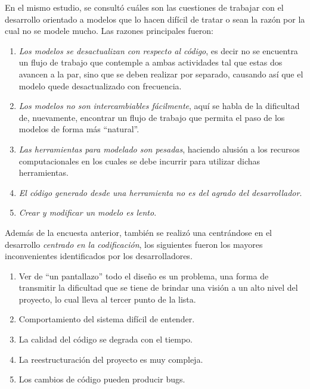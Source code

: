 En el mismo estudio, se consultó cuáles son las cuestiones de trabajar con el
desarrollo orientado a modelos que lo hacen difícil de tratar o sean la razón
por la cual no se modele mucho. Las razones principales fueron:
\begin{enumerate}
	\item \textit{Los modelos se desactualizan con respecto al código},
		es decir no se encuentra un flujo de trabajo que contemple a ambas
		actividades tal que estas dos avancen a la par, sino que se deben
		realizar por separado, causando así que el modelo quede desactualizado
		con frecuencia.
	\item \textit{Los modelos no son intercambiables fácilmente}, aquí se habla de la
		dificultad de, nuevamente, encontrar un flujo de trabajo que permita el paso de
		los modelos de forma más ``natural''.
	\item \textit{Las herramientas para modelado son pesadas}, haciendo alusión a los
		recursos computacionales en los cuales se debe incurrir para utilizar dichas
		herramientas.
		\item \textit{El código generado desde una herramienta no es del agrado del
			desarrollador}.
		\item \textit{Crear y modificar un modelo es lento}.
	\end{enumerate}

Además de la encuesta anterior, también se realizó
una centrándose en el desarrollo \textit{centrado en la codificación}, los
siguientes fueron los mayores inconvenientes identificados por los desarrolladores.

\begin{enumerate}
	\item Ver de ``un pantallazo'' todo el diseño es un problema, una forma de
		transmitir la dificultad que se tiene de brindar una visión a un alto nivel
		del proyecto, lo cual lleva al tercer punto de la lista.
	\item Comportamiento del sistema difícil de entender.
	\item La calidad del código se degrada con el tiempo.
	\item La reestructuración del proyecto es muy compleja.
	\item Los cambios de código pueden producir bugs.
\end{enumerate}

